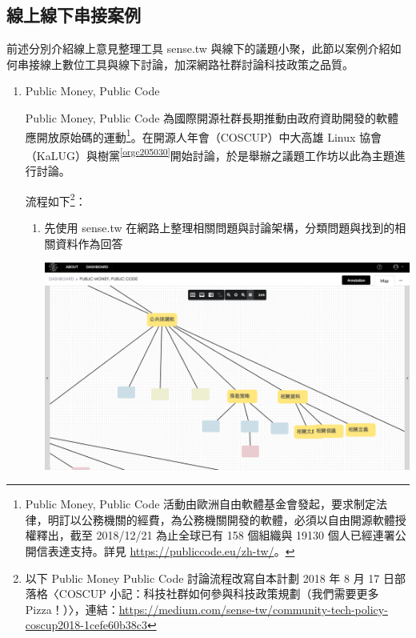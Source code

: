 \documentclass[12pt,a4paper]{article}
\begin{document}
\subsection{線上線下串接案例 }
\label{sec:orgf7cbd17}
前述分別介紹線上意見整理工具 sense.tw 與線下的議題小聚，此節以案例介紹如何串接線上數位工具與線下討論，加深網路社群討論科技政策之品質。
\begin{enumerate}
\item Public Money, Public Code
\label{sec:org1827b65}

Public Money, Public Code 為國際開源社群長期推動由政府資助開發的軟體應開放原始碼的運動\footnote{Public Money, Public Code 活動由歐洲自由軟體基金會發起，要求制定法律，明訂以公務機關的經費，為公務機關開發的軟體，必須以自由開源軟體授權釋出，截至 2018/12/21 為止全球已有 158 個組織與 19130 個人已經連署公開信表達支持。詳見 \url{https://publiccode.eu/zh-tw/}。}。在開源人年會（COSCUP）中大高雄 Linux 協會（KaLUG）與樹黨\textsuperscript{\ref{orgc205030}}開始討論，於是舉辦之議題工作坊以此為主題進行討論。

流程如下\footnote{以下 Public Money Public Code 討論流程改寫自本計劃 2018 年 8 月 17 日部落格〈COSCUP 小記：科技社群如何參與科技政策規劃（我們需要更多 Pizza！）〉，連結：\url{https://medium.com/sense-tw/community-tech-policy-coscup2018-1cefe60b38c3}}：

\begin{enumerate}
\item 先使用 sense.tw 在網路上整理相關問題與討論架構，分類問題與找到的相關資料作為回答
\begin{center}
\includegraphics[width=.9\linewidth]{./images/pmpc2.png}
\end{center}


\end{enumerate}
\end{enumerate}
\end{document}
